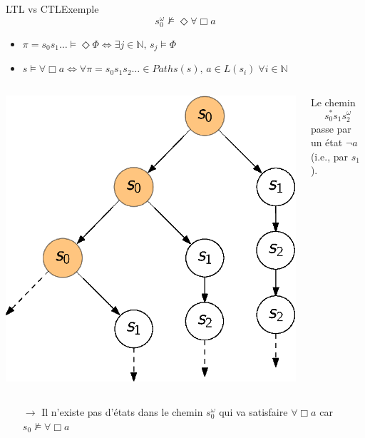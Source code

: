 \documentclass[compress]{beamer}
\begin{document}
\begin{frame}{LTL vs CTL}{Exemple}
\small
\vspace{-0.08\linewidth}
\[
  s_0^\omega \not \models \Diamond \forall \Box a
\]
\vspace{-0.05\linewidth}
\begin{itemize}
  \item $\pi = s_0s_1\dots \models \Diamond \Phi \iff \exists j \in \mathbb{N}
  , \, s_j \models \Phi$
  \item $s \models \forall \Box a \iff \forall \pi = s_0s_1s_2\dots \in Paths(s), \,
  a \in L(s_i) \; \forall i \in \mathbb{N} $
\end{itemize}
\begin{columns}
\begin{column}{0.6\linewidth}
  \centering
  \includegraphics[width=0.6\linewidth]{resources/CTL_counter_example_unfolding}
\end{column}
\begin{column}{0.5\linewidth}
  Le chemin {\color{fibeamer@orange}\[s_0^*s_1s_2^\omega\]} passe par un état $\neg a$ \\(i.e., par $s_1$).
\end{column}
\end{columns}
\vspace{0.01\linewidth}
\begin{itemize}
  \item[$\rightarrow$] Il n'existe pas d'états dans le chemin $s_0^\omega$ qui va satisfaire $\forall \Box a$ car $s_0 \not \models \forall \Box a$
\end{itemize}
\end{frame}
\end{document}
